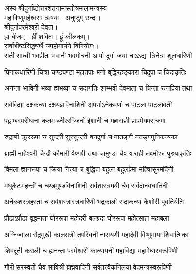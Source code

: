 
अस्य श्रीदुर्गाष्टोत्तरशतनामास्तोत्रमालामन्त्रस्य\\
महाविष्णुमहेश्वराः ऋषयः। अनुष्टुप् छन्दः।\\
श्रीदुर्गापरमेश्वरी देवता।\\
ह्रां बीजम्। ह्रीं शक्तिः। ह्रूं कीलकम्।\\
सर्वाभीष्टसिद्ध्यर्थे जपहोमार्चने विनियोगः।\\

\twolineshloka
{सती साध्वी भवप्रीता भवानी भवमोचनी}
{आर्या दुर्गा जया चाऽऽद्या त्रिनेत्रा शूलधारिणी}

\twolineshloka
{पिनाकधारिणी चित्रा चण्डघण्टा महातपाः}
{मनो बुद्धिरहङ्कारा चिद्रूपा च चिदाकृतिः}

\twolineshloka
{अनन्ता भाविनी भव्या ह्यभव्या च सदागतिः}
{शाम्भवी देवमाता च चिन्ता रत्नप्रिया तथा}

\twolineshloka
{सर्वविद्या दक्षकन्या दक्षयज्ञविनाशिनी}
{अपर्णाऽनेकवर्णा च पाटला पाटलावती}

\twolineshloka
{पट्टाम्बरपरीधाना कलमञ्जीररञ्जिनी}
{ईशानी च महाराज्ञी ह्यप्रमेयपराक्रमा}

\twolineshloka
{रुद्राणी क्रूररूपा च सुन्दरी सुरसुन्दरी}
{वनदुर्गा च मातङ्गी मतङ्गमुनिकन्यका}

\twolineshloka
{ब्राह्मी माहेश्वरी चैन्द्री कौमारी वैष्णवी तथा}
{चामुण्डा चैव वाराही लक्ष्मीश्च पुरुषाकृतिः}

\twolineshloka
{विमला ज्ञानरूपा च क्रिया नित्या च बुद्धिदा}
{बहुला बहुलप्रेमा महिषासुरमर्दिनी}

\twolineshloka
{मधुकैटभहन्त्री च चण्डमुण्डविनाशिनी}
{सर्वशास्त्रमयी चैव सर्वदानवघातिनी}

\twolineshloka
{अनेकशस्त्रहस्ता च सर्वशस्त्रास्त्रधारिणी}
{भद्रकाली सदाकन्या कैशोरी युवतिर्यतिः}

\twolineshloka
{प्रौढाऽप्रौढा वृद्धमाता घोररूपा महोदरी}
{बलप्रदा घोररूपा महोत्साहा महाबला}

\twolineshloka
{अग्निज्वाला रौद्रमुखी कालरात्री तपस्विनी}
{नारायणी महादेवी विष्णुमाया शिवात्मिका}

\twolineshloka
{शिवदूती कराली च ह्यनन्ता परमेश्वरी}
{कात्यायनी महाविद्या महामेधास्वरूपिणी}

\twolineshloka
{गौरी सरस्वती चैव सावित्री ब्रह्मवादिनी}
{सर्वतत्त्वैकनिलया वेदमन्त्रस्वरूपिणी}

